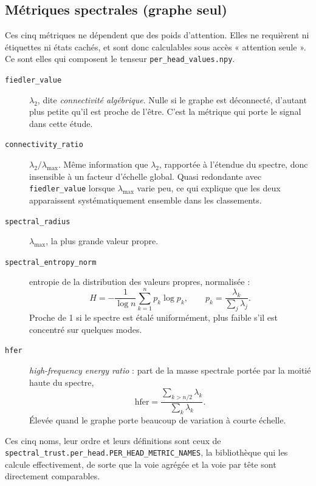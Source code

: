 \documentclass[11pt,a4paper]{article}
\begin{document}
\subsection{Métriques spectrales (graphe seul)}

Ces cinq métriques ne dépendent que des poids d'attention. Elles ne requièrent
ni étiquettes ni états cachés, et sont donc calculables sous accès
« attention seule ». Ce sont elles qui composent le tenseur
\texttt{per\_head\_values.npy}.

\begin{description}
\item[\texttt{fiedler\_value}] $\lambda_2$, dite \emph{connectivité
  algébrique}. Nulle si le graphe est déconnecté, d'autant plus petite qu'il
  est proche de l'être. C'est la métrique qui porte le signal dans cette étude.

\item[\texttt{connectivity\_ratio}] $\lambda_2 / \lambda_{\max}$. Même
  information que $\lambda_2$, rapportée à l'étendue du spectre, donc
  insensible à un facteur d'échelle global. Quasi redondante avec
  \texttt{fiedler\_value} lorsque $\lambda_{\max}$ varie peu, ce qui explique
  que les deux apparaissent systématiquement ensemble dans les classements.

\item[\texttt{spectral\_radius}] $\lambda_{\max}$, la plus grande valeur
  propre.

\item[\texttt{spectral\_entropy\_norm}] entropie de la distribution des valeurs
  propres, normalisée :
  \[
    H = -\frac{1}{\log n}\sum_{k=1}^{n} p_k \log p_k,
    \qquad p_k = \frac{\lambda_k}{\sum_j \lambda_j}.
  \]
  Proche de 1 si le spectre est étalé uniformément, plus faible s'il est
  concentré sur quelques modes.

\item[\texttt{hfer}] \emph{high-frequency energy ratio} : part de la masse
  spectrale portée par la moitié haute du spectre,
  \[
    \mathrm{hfer} = \frac{\sum_{k > n/2} \lambda_k}{\sum_k \lambda_k}.
  \]
  Élevée quand le graphe porte beaucoup de variation à courte échelle.
\end{description}

\noindent Ces cinq noms, leur ordre et leurs définitions sont ceux de
\texttt{spectral\_trust.per\_head.PER\_HEAD\_METRIC\_NAMES}, la bibliothèque
qui les calcule effectivement, de sorte que la voie agrégée et la voie par tête
sont directement comparables.
\end{document}
